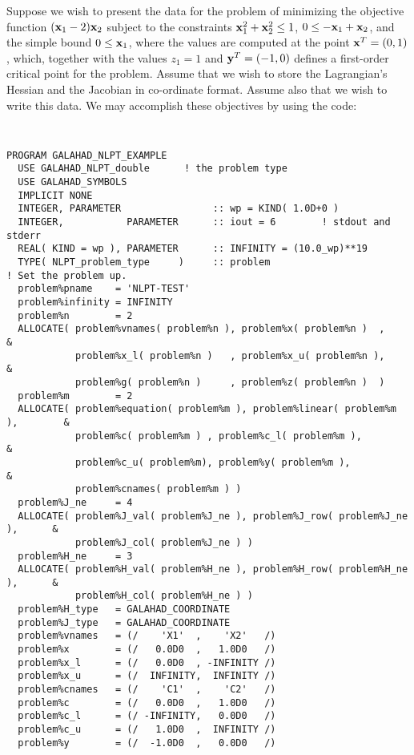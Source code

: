 \documentclass{galahad}
\begin{document}

\galexample
Suppose we wish to present the data for the problem of minimizing
the objective function
$({\mathbf{x}}_1 - 2 ) {\mathbf{x}}_2$
subject to the constraints
${\mathbf{x}}_1^2 +{\mathbf{x}}_2^2 \leq 1$,
$0 \leq -{\mathbf{x}}_1 + {\mathbf{x}}_2 $, and the simple bound
$0 \leq  {\mathbf{x}}_1$, where the values are computed at the point
${\mathbf{x}}^T = (0,1)$, which, together with the values $z_1 = 1$
and ${\mathbf{y}}^T = ( -1, 0 )$ defines a first-order critical point for the problem.
Assume that we wish to store the Lagrangian's Hessian and the Jacobian in
co-ordinate format. Assume also that we wish to write this data.  We may
accomplish these objectives by using the code:
{\tt \small
\begin{verbatim}
PROGRAM GALAHAD_NLPT_EXAMPLE
  USE GALAHAD_NLPT_double      ! the problem type
  USE GALAHAD_SYMBOLS
  IMPLICIT NONE
  INTEGER, PARAMETER                :: wp = KIND( 1.0D+0 )
  INTEGER,           PARAMETER      :: iout = 6        ! stdout and stderr
  REAL( KIND = wp ), PARAMETER      :: INFINITY = (10.0_wp)**19
  TYPE( NLPT_problem_type     )     :: problem 
! Set the problem up.
  problem%pname    = 'NLPT-TEST'
  problem%infinity = INFINITY
  problem%n        = 2
  ALLOCATE( problem%vnames( problem%n ), problem%x( problem%n )  ,             &
            problem%x_l( problem%n )   , problem%x_u( problem%n ),             &
            problem%g( problem%n )     , problem%z( problem%n )  )
  problem%m        = 2
  ALLOCATE( problem%equation( problem%m ), problem%linear( problem%m ),        &
            problem%c( problem%m ) , problem%c_l( problem%m ),                 &
            problem%c_u( problem%m), problem%y( problem%m ),                   &
            problem%cnames( problem%m ) ) 
  problem%J_ne     = 4
  ALLOCATE( problem%J_val( problem%J_ne ), problem%J_row( problem%J_ne ),      &
            problem%J_col( problem%J_ne ) )
  problem%H_ne     = 3
  ALLOCATE( problem%H_val( problem%H_ne ), problem%H_row( problem%H_ne ),      &
            problem%H_col( problem%H_ne ) )
  problem%H_type   = GALAHAD_COORDINATE
  problem%J_type   = GALAHAD_COORDINATE
  problem%vnames   = (/    'X1'  ,    'X2'   /)
  problem%x        = (/   0.0D0  ,   1.0D0   /)
  problem%x_l      = (/   0.0D0  , -INFINITY /)
  problem%x_u      = (/  INFINITY,  INFINITY /)
  problem%cnames   = (/    'C1'  ,    'C2'   /)
  problem%c        = (/   0.0D0  ,   1.0D0   /)
  problem%c_l      = (/ -INFINITY,   0.0D0   /)
  problem%c_u      = (/   1.0D0  ,  INFINITY /)
  problem%y        = (/  -1.0D0  ,   0.0D0   /)

\end{verbatim}}
\end{document}
